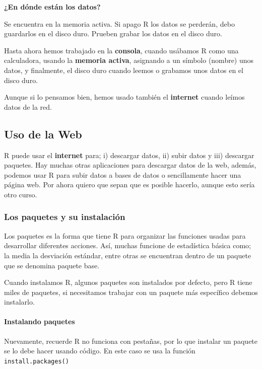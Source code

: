 \documentclass[
]{article}
\begin{document}
\textbf{¿En dónde están los datos?}

Se encuentra en la memoria activa. Si apago R los datos se perderán,
debo guardarlos en el disco duro. Prueben grabar los datos en el disco
duro.

Hasta ahora hemos trabajado en la \textbf{consola}, cuando usábamos R
como una calculadora, usando la \textbf{memoria activa}, asignando a un
símbolo (nombre) unos datos, y finalmente, el disco duro cuando leemos o
grabamos unos datos en el disco duro.

Aunque si lo pensamos bien, hemos usado también el \textbf{internet}
cuando leímos datos de la red.

\hypertarget{uso-de-la-web}{%
\subsection{Uso de la Web}\label{uso-de-la-web}}

R puede usar el \textbf{internet} para; i) descargar datos, ii) subir
datos y iii) descargar paquetes. Hay muchas otras aplicaciones para
descargar datos de la web, además, podemos usar R para subir datos a
bases de datos o sencillamente hacer una página web. Por ahora quiero
que sepan que es posible hacerlo, aunque esto sería otro curso.

\hypertarget{los-paquetes-y-su-instalaciuxf3n}{%
\subsubsection{Los paquetes y su
instalación}\label{los-paquetes-y-su-instalaciuxf3n}}

Los paquetes es la forma que tiene R para organizar las funciones usadas
para desarrollar diferentes acciones. Así, muchas funcione de
estadística básica como; la media la desviación estándar, entre otras se
encuentran dentro de un paquete que se denomina paquete base.

Cuando instalamos R, algunos paquetes son instalados por defecto, pero R
tiene miles de paquetes, si necesitamos trabajar con un paquete más
específico debemos instalarlo.

\hypertarget{instalando-paquetes}{%
\paragraph{Instalando paquetes}\label{instalando-paquetes}}

Nuevamente, recuerde R no funciona con pestañas, por lo que instalar un
paquete se lo debe hacer usando código. En este caso se usa la función
\texttt{install.packages()}
\end{document}
